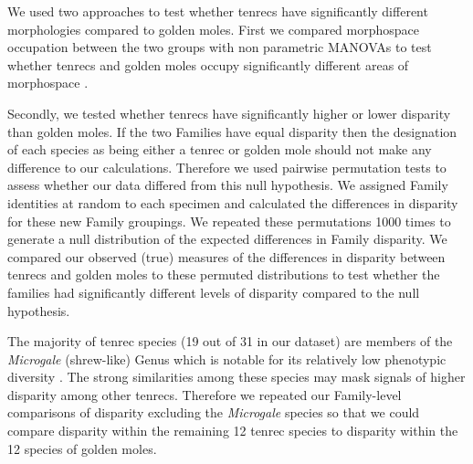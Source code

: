 \documentclass[12pt,a4paper]{article}
\begin{document}

	We used two approaches to test whether tenrecs have significantly different morphologies compared to golden moles. First we compared morphospace occupation between the two groups with non parametric MANOVAs \citep{Anderson2001} to test whether tenrecs and golden moles occupy significantly different areas of morphospace \citep[e.g][]{Serb2011, Ruta2013}.
	 
	Secondly, we tested whether tenrecs have significantly higher or lower disparity than golden moles. If the two Families have equal disparity then the designation of each species as being either a tenrec or golden mole should not make any difference to our calculations. Therefore we used pairwise permutation tests to assess whether our data differed from this null hypothesis. We assigned Family identities at random to each specimen and calculated the differences in disparity for these new Family groupings. We repeated these permutations 1000 times to generate a null distribution of the expected differences in Family disparity. We compared our observed (true) measures of the differences in disparity between tenrecs and golden moles to these permuted distributions to test whether the families had significantly different levels of disparity compared to the null hypothesis.


	The majority of tenrec species (19 out of 31 in our dataset) are members of the \textit{Microgale} (shrew-like) Genus which is notable for its relatively low phenotypic diversity \citep{Soarimalala2011, Jenkins2003}. The strong similarities among these species may mask signals of higher disparity among other tenrecs. Therefore we repeated our Family-level comparisons of disparity excluding the \textit{Microgale} species so that we could compare disparity within the remaining 12 tenrec species to disparity within the 12 species of golden moles.
\end{document}
